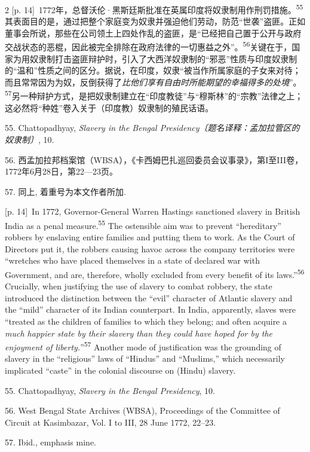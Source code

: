 \documentclass[10pt,a4paper]{article}
\begin{document}
\begin{paracol}{2}
{\scriptsize\color{gray} [p. 14]}\ 1772年，总督沃伦·黑斯廷斯批准在英属印度将奴隶制用作刑罚措\mbox{施。\textsuperscript{55}}其表面目的是，通过把整个家庭变为奴隶并强迫他们劳动，防范“世袭”盗匪。正如董事会所说，那些在公司领土上四处作乱的盗匪，是“已经把自己置于公开与政府交战状态的恶棍，因此被完全排除在政府法律的一切惠益之外”。\nobreak\textsuperscript{56}关键在于，国家为用奴隶制打击盗匪辩护时，引入了大西洋奴隶制的“邪恶”性质与印度奴隶制的“温和”性质之间的区分。据说，在印度，奴隶“被当作所属家庭的子女来对待；而且常常因为为奴，反倒获得了\textit{比他们享有自由时所能期望的幸福得多的处境}”。\nobreak\textsuperscript{57}另一种辩护方式，是把奴隶制建立在“印度教徒”与“穆斯林”的“宗教”法律之上；这必然将“种姓”卷入关于（印度教）奴隶制的殖民话语。\par{\small 55. Chattopadhyay, \textit{Slavery in the Bengal Presidency〔题名译释：孟加拉管区的奴隶制〕}, 10.\par}{\small 56. 西孟加拉邦档案馆（WBSA），《卡西姆巴扎巡回委员会议事录》，第I至III卷，1772年6月28日，第22—23页。\par}{\small 57. 同上, 着重号为本文作者所加.\par}
\switchcolumn
{\scriptsize\color{gray} [p. 14]}\ In 1772, Governor-General Warren Hastings sanctioned slavery in British India as a penal measure.\nobreak\textsuperscript{55} The ostensible aim was to prevent “hereditary” robbers by enslaving entire families and putting them to work. As the Court of Directors put it, the robbers causing havoc across the company territories were “wretches who have placed themselves in a state of declared war with Government, and are, therefore, wholly excluded from every benefit of its laws.”\nobreak\textsuperscript{56} Crucially, when justifying the use of slavery to combat robbery, the state introduced the distinction between the “evil” character of Atlantic slavery and the “mild” character of its Indian counterpart. In India, apparently, slaves were “treated as the children of families to which they belong; and often acquire a \textit{much happier state by their slavery than they could have hoped for by the enjoyment of liberty.}”\nobreak\textsuperscript{57} Another mode of justification was the grounding of slavery in the “religious” laws of “Hindus” and “Muslims,” which necessarily implicated “caste” in the colonial discourse on (Hindu) slavery.\par{\small 55. Chattopadhyay, \textit{Slavery in the Bengal Presidency}, 10.\par}{\small 56. West Bengal State Archives (WBSA), Proceedings of the Committee of Circuit at Kasimbazar, Vol. I to III, 28 June 1772, 22–23.\par}{\small 57. Ibid., emphasis mine.\par}

\end{paracol}
\end{document}

